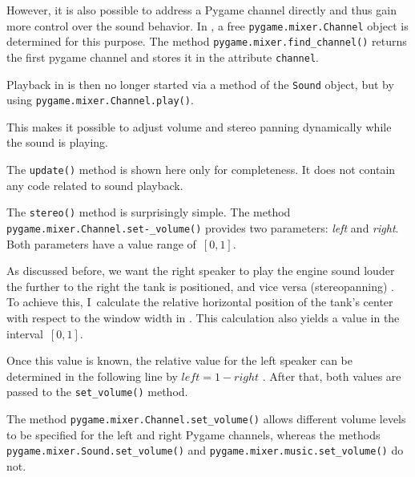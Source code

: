 \begin{hintbox}
	However, it is also possible to address a Pygame channel directly and thus gain more control over the sound behavior. In , a free \texttt{pygame.mixer.Channel} object is determined for this purpose. The method \texttt{pygame.mixer.find\-\_chan\-nel()}  returns the first pygame channel and stores it in the attribute \texttt{channel}.
\end{hintbox} 

Playback in  is then no longer started via a method of the \texttt{Sound} object, but by using \texttt{pygame.mixer.Channel.play()}.

This makes it possible to adjust volume and stereo panning dynamically while the sound is playing.

\newpage
{} 

The \texttt{update()} method is shown here only for completeness. It does not contain any code related to sound playback.


The \texttt{stereo()} method is surprisingly simple. The method \texttt{pygame.mixer.Channel\-.set-\_vol\-ume()} provides two parameters: \emph{left} and \emph{right}. Both parameters have a value range of~$[0, 1]$.

As discussed before, we want the right speaker to play the engine sound louder the further to the right the tank is positioned, and vice versa (\gls{stereopanning}) . To achieve this, I~calculate the relative horizontal position of the tank’s center with respect to the window width in . This calculation also yields a value in the interval~$[0, 1]$.

Once this value is known, the relative value for the left speaker can be determined in the following line by $left = 1 - right $ . After that, both values are passed to the \texttt{set\_volume()} method.

\begin{hintbox}[Hint]
	The method \texttt{pygame.mixer.Channel\-.set\-\_vol\-ume()} allows different volume levels to be specified for the left and right Pygame channels, whereas the methods \texttt{pygame\-.mix\-er\-.Sound\-.set\-\_vol\-ume()} and \texttt{pygame.mixer.music\-.set\-\_vol\-ume()} do not. 
\end{hintbox}
 
